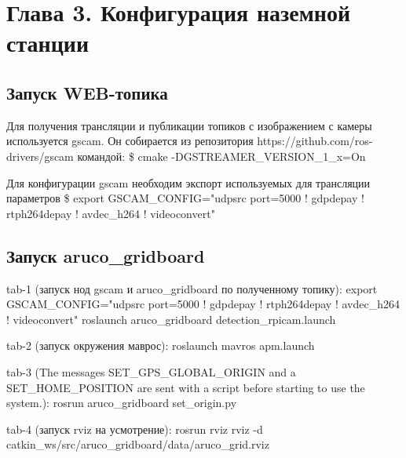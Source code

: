 
\section{Глава 3. Конфигурация наземной станции}

\subsection{Запуск WEB-топика}
Для получения трансляции и публикации топиков с изображением с камеры используется gscam. Он собирается из репозитория https://github.com/ros-drivers/gscam командой:
\$ cmake -DGSTREAMER\_VERSION\_1\_x=On

Для конфигурации gscam необходим экспорт используемых для трансляции параметров \$ export GSCAM\_CONFIG="udpsrc port=5000 ! gdpdepay ! rtph264depay ! avdec\_h264 ! videoconvert"



\subsection{Запуск aruco\_gridboard}
tab-1 (запуск нод gscam и aruco\_gridboard по полученному топику): 
export GSCAM\_CONFIG="udpsrc port=5000 ! gdpdepay ! rtph264depay ! avdec\_h264 ! videoconvert"
roslaunch aruco\_gridboard detection\_rpicam.launch

tab-2 (запуск окружения маврос): roslaunch mavros apm.launch

tab-3 (The messages SET\_GPS\_GLOBAL\_ORIGIN and a SET\_HOME\_POSITION are sent with a script before starting to use the system.): rosrun aruco\_gridboard set\_origin.py

tab-4 (запуск rviz на усмотрение): rosrun rviz rviz -d catkin\_ws/src/aruco\_gridboard/data/aruco\_grid.rviz


